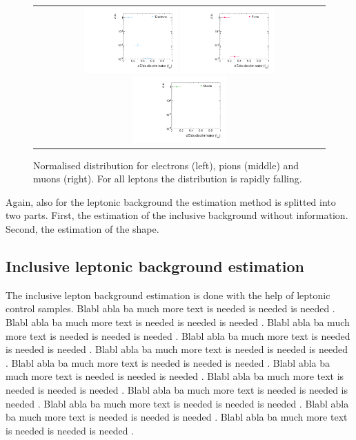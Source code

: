 \begin{figure}[!tb]
  \centering 
  \vspace{25pt}
  \begin{tabular}{c}
    \includegraphics[width=0.33\textwidth]{figures/analysis/IasDistributionForElecs.pdf}
    \includegraphics[width=0.33\textwidth]{figures/analysis/IasDistributionForPions.pdf}
    \includegraphics[width=0.33\textwidth]{figures/analysis/IasDistributionForMuons.pdf}
  \end{tabular}
  \caption{Normalised \ias distribution for electrons (left), pions (middle) and muons (right). 
           For all leptons the \ias distribution is rapidly falling.}
  \label{fig:IasDist}
\vspace{25pt}
\end{figure}


Again, also for the leptonic background the estimation method is splitted into two parts.
First, the estimation of the inclusive background without \ias information.
Second, the estimation of the \ias shape.


\subsection*{Inclusive leptonic background estimation}
The inclusive lepton background estimation is done with the help of leptonic control samples.
Blabl abla ba much more text is needed is needed is needed .
Blabl abla ba much more text is needed is needed is needed .
Blabl abla ba much more text is needed is needed is needed .
Blabl abla ba much more text is needed is needed is needed .
Blabl abla ba much more text is needed is needed is needed .
Blabl abla ba much more text is needed is needed is needed .
Blabl abla ba much more text is needed is needed is needed .
Blabl abla ba much more text is needed is needed is needed .
Blabl abla ba much more text is needed is needed is needed .
Blabl abla ba much more text is needed is needed is needed .
Blabl abla ba much more text is needed is needed is needed .
Blabl abla ba much more text is needed is needed is needed .


